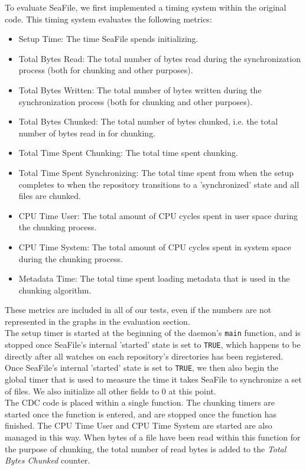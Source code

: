 \documentclass[table]{article}
\newcommand{\code}[1]{\texttt{#1}}
\begin{document}
\begin{multicols}{2}
To evaluate SeaFile, we first implemented a timing system within the original code. This timing system evaluates the following metrics:

\begin{itemize}
    \item Setup Time: The time SeaFile spends initializing.
    \item Total Bytes Read: The total number of bytes read during the synchronization process (both for chunking and other purposes).
    \item Total Bytes Written: The total number of bytes written during the synchronization process (both for chunking and other purposes).
    \item Total Bytes Chunked: The total number of bytes chunked, i.e. the total number of bytes read in for chunking.
    \item Total Time Spent Chunking: The total time spent chunking.
    \item Total Time Spent Synchronizing: The total time spent from when the setup completes to when the repository transitions to a 'synchronized' state and all files are chunked.
    \item CPU Time User: The total amount of CPU cycles spent in user space during the chunking process.
    \item CPU Time System: The total amount of CPU cycles spent in system space during the chunking process.
    \item Metadata Time: The total time spent loading metadata that is used in the chunking algorithm.
\end{itemize}

These metrics are included in all of our tests, even if the numbers are not represented in the graphs in the evaluation section.\\

The setup timer is started at the beginning of the daemon's \code{main} function, and is stopped once SeaFile's internal 'started' state is set to \code{TRUE}, which happens to be directly after all watches on each repository's directories has been registered. Once SeaFile's internal 'started' state is set to \code{TRUE}, we then also begin the global timer that is used to measure the time it takes SeaFile to synchronize a set of files. We also initialize all other fields to 0 at this point.\\

The CDC code is placed within a single function. The chunking timers are started once the function is entered, and are stopped once the function has finished. The CPU Time User and CPU Time System are started are also managed in this way. When bytes of a file have been read within this function for the purpose of chunking, the total number of read bytes is added to the \textit{Total Bytes Chunked} counter.\\


\end{multicols}
\end{document}
